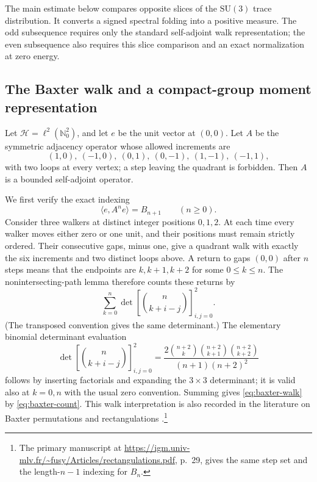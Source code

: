 \documentclass[11pt,a4paper]{article}
\theoremstyle{remark}\newtheorem{remark}[theorem]{Remark}
\numberwithin{equation}{section}
\begin{document}
The main estimate below compares opposite slices of the $\mathrm{SU}(3)$
trace distribution. It converts a signed spectral folding into a
positive measure. The odd subsequence requires only the standard
self-adjoint walk representation; the even subsequence also requires
this slice comparison and an exact normalization at zero energy.

\subsection{The Baxter walk and a compact-group moment representation}

Let $\mathcal H=\ell^2(\mathbb N_0^2)$, and let $e$ be the unit vector at
$(0,0)$. Let $A$ be the symmetric adjacency operator whose allowed
increments are
\[
 (1,0),\ (-1,0),\ (0,1),\ (0,-1),\ (1,-1),\ (-1,1),
\]
with two loops at every vertex; a step leaving the quadrant is forbidden.
Then $A$ is a bounded self-adjoint operator.

We first verify the exact indexing
\begin{equation}\label{eq:baxter-walk}
 \langle e,A^ne\rangle=B_{n+1}\qquad(n\ge0).
\end{equation}
Consider three walkers at distinct integer positions $0,1,2$. At each
time every walker moves either zero or one unit, and their positions
must remain strictly ordered. Their consecutive gaps, minus one, give
a quadrant walk with exactly the six increments and two distinct loops
above. A return to gaps $(0,0)$ after $n$ steps means that the endpoints
are $k,k+1,k+2$ for some $0\le k\le n$. The nonintersecting-path
lemma therefore counts these returns by
\[
 \sum_{k=0}^n\det\left[\binom n{k+i-j}\right]_{i,j=0}^2.
\]
(The transposed convention gives the same determinant.) The elementary
binomial determinant evaluation
\[
 \det\left[\binom n{k+i-j}\right]_{i,j=0}^2
 =\frac{2\binom{n+2}{k}\binom{n+2}{k+1}\binom{n+2}{k+2}}
 {(n+1)(n+2)^2}
\]
follows by inserting factorials and expanding the $3\times3$
determinant; it is valid also at $k=0,n$ with the usual zero convention.
Summing gives \eqref{eq:baxter-walk} by \eqref{eq:baxter-count}.
This walk interpretation is also recorded in the literature on Baxter
permutations and rectangulations \cite{AsinowskiCardinalFelsnerFusy2025}.\footnote{The primary manuscript at
\url{https://igm.univ-mlv.fr/~fusy/Articles/rectangulations.pdf}, p.~29,
gives the same step set and the length-$n-1$ indexing for $B_n$.}
\end{document}
